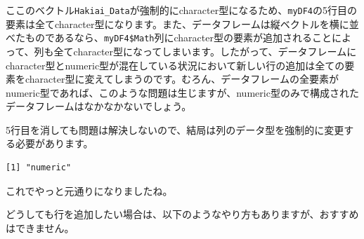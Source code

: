 \documentclass[
  a4paper,
  pandoc,
  ja=standard,
  jafont=haranoaji]{bxjsbook}
\newenvironment{Shaded}{\begin{snugshade}}{\end{snugshade}}
\newcommand{\FunctionTok}[1]{\textcolor[rgb]{0.28,0.35,0.67}{#1}}
\newcommand{\NormalTok}[1]{\textcolor[rgb]{0.00,0.48,0.65}{#1}}
\newcommand{\OtherTok}[1]{\textcolor[rgb]{0.00,0.48,0.65}{#1}}
\newcommand{\SpecialCharTok}[1]{\textcolor[rgb]{0.37,0.37,0.37}{#1}}
\begin{document}
ここのベクトル\texttt{Hakiai\_Data}が強制的にcharacter型になるため、\texttt{myDF4}の5行目の要素は全てcharacter型になります。また、データフレームは縦ベクトルを横に並べたものであるなら、\texttt{myDF4\$Math}列にcharacter型の要素が追加されることによって、列も全てcharacter型になってしまいます。したがって、データフレームにcharacter型とnumeric型が混在している状況において新しい行の追加は全ての要素をcharacter型に変えてしまうのです。むろん、データフレームの全要素がnumeric型であれば、このような問題は生じますが、numeric型のみで構成されたデータフレームはなかなかないでしょう。

5行目を消しても問題は解決しないので、結局は列のデータ型を強制的に変更する必要があります。

\begin{Shaded}
\end{Shaded}

\begin{verbatim}
[1] "numeric"
\end{verbatim}

これでやっと元通りになりましたね。

どうしても行を追加したい場合は、以下のようなやり方もありますが、おすすめはできません。
\end{document}
